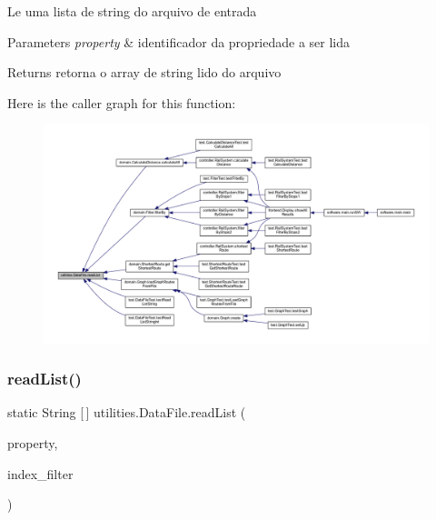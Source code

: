 Le uma lista de string do arquivo de entrada 
\begin{DoxyParams}{Parameters}
{\em property} & identificador da propriedade a ser lida \\
\hline
\end{DoxyParams}
\begin{DoxyReturn}{Returns}
retorna o array de string lido do arquivo 
\end{DoxyReturn}
Here is the caller graph for this function\+:\nopagebreak
\begin{figure}[H]
\begin{center}
\leavevmode
\includegraphics[width=350pt]{classutilities_1_1_data_file_a68332bb2b70bafbaae007d952ba4264b_icgraph}
\end{center}
\end{figure}
\mbox{\label{classutilities_1_1_data_file_a86acc1699af206a96ab51c94d6663afe}} 
\subsubsection{\texorpdfstring{read\+List()}{readList()}\hspace{0.1cm}{\footnotesize\ttfamily [2/2]}}
{\footnotesize\ttfamily static String \mbox{[}$\,$\mbox{]} utilities.\+Data\+File.\+read\+List (\begin{DoxyParamCaption}\item[{\hyperlink{enumutilities_1_1_file_property}{File\+Property}}]{property,  }\item[{int}]{index\+\_\+filter }\end{DoxyParamCaption})\hspace{0.3cm}{\ttfamily [static]}}

